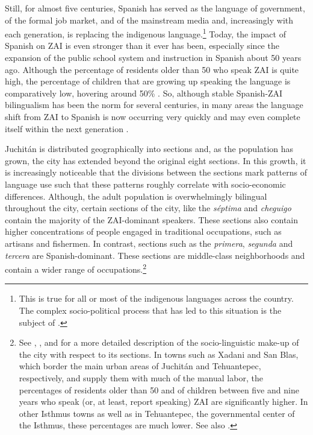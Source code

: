 Still, for almost five centuries, Spanish has served as the language of government, of the formal job market, and of the mainstream media and, increasingly with each generation, is replacing the indigenous language.\footnote{This is true for all or most of the indigenous languages across the country. The complex socio-political process that has led to this situation is the subject of \citet{heath1972}.}  Today, the impact of Spanish on ZAI is even stronger than it ever has been, especially since the expansion of the public school system and instruction in Spanish about 50 years ago. Although the percentage of residents older than 50 who speak ZAI is quite high, the percentage of children that are growing up speaking the language is comparatively low, hovering around 50\% \citep{augsburger2004}. So, although stable Spanish-ZAI bilingualism has been the norm for several centuries, in many areas the language shift from ZAI to Spanish is now occurring very quickly and may even complete itself within the next generation \citep{augsburger2004}.

Juchit\'{a}n is distributed geographically into sections and, as the population has grown, the city has extended beyond the original eight sections. In this growth, it is increasingly noticeable that the divisions between the sections mark patterns of language use such that these patterns roughly correlate with socio-economic differences.  Although, the adult population is overwhelmingly bilingual throughout the city, certain sections of the city, like the \textit{s\'{e}ptima} and \textit{cheguigo} contain the majority of the ZAI-dominant speakers. These sections also contain higher concentrations of people engaged in traditional occupations, such as artisans and fishermen. In contrast, sections such as the \textit{primera},  \textit{segunda} and  \textit{tercera} are Spanish-dominant. These sections are middle-class neighborhoods and contain a wider range of occupations.\footnote{See \citet{saynes2002}, \citet{augsburger2004}, and \citet[Chapter 1]{mccomsey2015} for a more detailed description of the socio-linguistic make-up of the city with respect to its sections. In towns such as Xadani and San Blas, which border the main urban areas of Juchit\'{a}n and Tehuantepec, respectively, and supply them with much of the manual labor, the percentages of residents older than 50 and of children between five and nine years who speak (or, at least, report speaking) ZAI are significantly higher. In other Isthmus towns as well as in Tehuantepec, the governmental center of the Isthmus, these percentages are much lower. See also \citet{toledo2018}.} 


